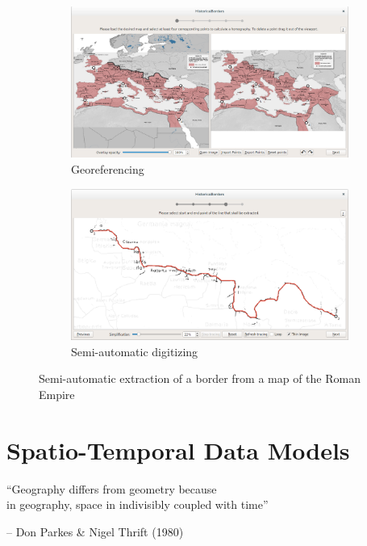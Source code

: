 \begin{figure}[ht]
  \centering
  \begin{subfigure}{0.48\textwidth}
    \centering
    \includegraphics[width=0.95\linewidth]{graphics/basics/hgis/hibo1.png}
    \caption{Georeferencing}
  \end{subfigure}
  \begin{subfigure}{0.48\textwidth}
    \centering
    \includegraphics[width=0.95\linewidth]{graphics/basics/hgis/hibo2.png}
    \caption{Semi-automatic digitizing}
  \end{subfigure}
  \caption{Semi-automatic extraction of a border from a map of the Roman Empire \protect\footnotemark}
  \vspace{2em} %
  \label{fig:hibo}
\end{figure}






\section{Spatio-Temporal Data Models} %
\label{sec:spatio_temporal_data_models}
\begin{quoteit}
  ``Geography differs from geometry because \\
  in geography, space in indivisibly coupled with time''
\end{quoteit}
\hfill -- Don Parkes \& Nigel Thrift (1980)

